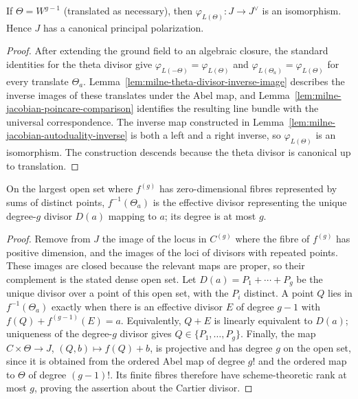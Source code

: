 \begin{theorem}\label{thm:milne-jacobian-principal-polarization}
If $\Theta=W^{g-1}$ (translated as necessary), then $\varphi_{L(\Theta)}:J\to J^\vee$ is an isomorphism. Hence $J$ has a canonical principal polarization.
\end{theorem}
\begin{proof}
After extending the ground field to an algebraic closure, the standard
identities for the theta divisor give
$\varphi_{L(-\Theta)}=\varphi_{L(\Theta)}$ and
$\varphi_{L(\Theta_a)}=\varphi_{L(\Theta)}$ for every translate $\Theta_a$.
Lemma~\ref{lem:milne-theta-divisor-inverse-image} describes the inverse images
of these translates under the Abel map, and
Lemma~\ref{lem:milne-jacobian-poincare-comparison} identifies the resulting
line bundle with the universal correspondence.  The inverse map constructed
in Lemma~\ref{lem:milne-jacobian-autoduality-inverse} is both a left and a right
inverse, so $\varphi_{L(\Theta)}$ is an isomorphism.  The construction descends
because the theta divisor is canonical up to translation.
\end{proof}
\begin{lemma}\label{lem:milne-theta-divisor-inverse-image}
On the largest open set where $f^{(g)}$ has zero-dimensional fibres represented by sums of distinct points, $f^{-1}(\Theta_a)$ is the effective divisor representing the unique degree-$g$ divisor $D(a)$ mapping to $a$; its degree is at most $g$.
\end{lemma}

\begin{proof}
Remove from $J$ the image of the locus in $C^{(g)}$ where the fibre of
$f^{(g)}$ has positive dimension, and the images of the loci of divisors with
repeated points.  These images are closed because the relevant maps are
proper, so their complement is the stated dense open set.  Let
$D(a)=P_1+\cdots+P_g$ be the unique divisor over a point of this open set,
with the $P_i$ distinct.  A point $Q$ lies in $f^{-1}(\Theta_a)$ exactly when
there is an effective divisor $E$ of degree $g-1$ with
$f(Q)+f^{(g-1)}(E)=a$.  Equivalently, $Q+E$ is linearly equivalent to
$D(a)$; uniqueness of the degree-$g$ divisor gives
$Q\in\{P_1,\ldots,P_g\}$.  Finally, the map
$C\times\Theta\to J$, $(Q,b)\mapsto f(Q)+b$, is projective and has degree
$g$ on the open set, since it is obtained from the ordered Abel map of degree
$g!$ and the ordered map to $\Theta$ of degree $(g-1)!$.  Its finite fibres
therefore have scheme-theoretic rank at most $g$, proving the assertion about
the Cartier divisor.
\end{proof}


